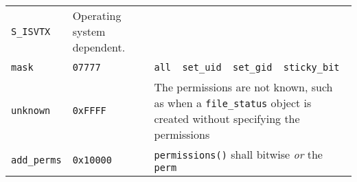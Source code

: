 \begin{longtable}[c]{@{}llll@{}}
\begin{minipage}[t]{0.22\columnwidth}\raggedright\strut
\texttt{S\_ISVTX}
\strut\end{minipage} &
\begin{minipage}[t]{0.22\columnwidth}\raggedright\strut
Operating system dependent.
\strut\end{minipage}\tabularnewline
\begin{minipage}[t]{0.22\columnwidth}\raggedright\strut
\texttt{mask}
\strut\end{minipage} &
\begin{minipage}[t]{0.22\columnwidth}\raggedright\strut
\texttt{07777}
\strut\end{minipage} &
\begin{minipage}[t]{0.22\columnwidth}\raggedright\strut
~
\strut\end{minipage} &
\begin{minipage}[t]{0.22\columnwidth}\raggedright\strut
\texttt{all\ \textbar{}\ set\_uid\ \textbar{}\ set\_gid\ \textbar{}\ sticky\_bit}
\strut\end{minipage}\tabularnewline
\begin{minipage}[t]{0.22\columnwidth}\raggedright\strut
\texttt{unknown}
\strut\end{minipage} &
\begin{minipage}[t]{0.22\columnwidth}\raggedright\strut
\texttt{0xFFFF}
\strut\end{minipage} &
\begin{minipage}[t]{0.22\columnwidth}\raggedright\strut
\strut\end{minipage} &
\begin{minipage}[t]{0.22\columnwidth}\raggedright\strut
The permissions are not known, such as when a \texttt{file\_status}
object is created without specifying the permissions
\strut\end{minipage}\tabularnewline
\begin{minipage}[t]{0.22\columnwidth}\raggedright\strut
\texttt{add\_perms}
\strut\end{minipage} &
\begin{minipage}[t]{0.22\columnwidth}\raggedright\strut
\texttt{0x10000}
\strut\end{minipage} &
\begin{minipage}[t]{0.22\columnwidth}\raggedright\strut
~
\strut\end{minipage} &
\begin{minipage}[t]{0.22\columnwidth}\raggedright\strut
\texttt{permissions()} shall bitwise \emph{or} the \texttt{perm}

\end{minipage}
\end{longtable}
